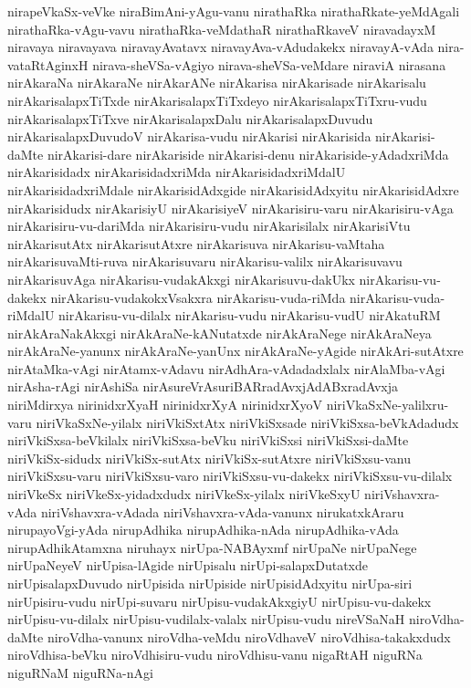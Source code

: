 {nirapeVkaSx-veVke
niraBimAni-yAgu-vanu
nirathaRka
nirathaRkate-yeMdAgali
nirathaRka-vAgu-vavu
nirathaRka-veMdathaR
nirathaRkaveV
niravadayxM
niravaya
niravayava
niravayAvatavx
niravayAva-vAdudakekx
niravayA-vAda
nira-vataRtAginxH
nirava-sheVSa-vAgiyo
nirava-sheVSa-veMdare
niraviA
nirasana
nirAkaraNa
nirAkaraNe
nirAkarANe
nirAkarisa
nirAkarisade
nirAkarisalu
nirAkarisalapxTiTxde
nirAkarisalapxTiTxdeyo
nirAkarisalapxTiTxru-vudu
nirAkarisalapxTiTxve
nirAkarisalapxDalu
nirAkarisalapxDuvudu
nirAkarisalapxDuvudoV
nirAkarisa-vudu
nirAkarisi
nirAkarisida
nirAkarisi-daMte
nirAkarisi-dare
nirAkariside
nirAkarisi-denu
nirAkariside-yAdadxriMda
nirAkarisidadx
nirAkarisidadxriMda
nirAkarisidadxriMdalU
nirAkarisidadxriMdale
nirAkarisidAdxgide
nirAkarisidAdxyitu
nirAkarisidAdxre
nirAkarisidudx
nirAkarisiyU
nirAkarisiyeV
nirAkarisiru-varu
nirAkarisiru-vAga
nirAkarisiru-vu-dariMda
nirAkarisiru-vudu
nirAkarisilalx
nirAkarisiVtu
nirAkarisutAtx
nirAkarisutAtxre
nirAkarisuva
nirAkarisu-vaMtaha
nirAkarisuvaMti-ruva
nirAkarisuvaru
nirAkarisu-valilx
nirAkarisuvavu
nirAkarisuvAga
nirAkarisu-vudakAkxgi
nirAkarisuvu-dakUkx
nirAkarisu-vu-dakekx
nirAkarisu-vudakokxVsakxra
nirAkarisu-vuda-riMda
nirAkarisu-vuda-riMdalU
nirAkarisu-vu-dilalx
nirAkarisu-vudu
nirAkarisu-vudU
nirAkatuRM
nirAkAraNakAkxgi
nirAkAraNe-kANutatxde
nirAkAraNege
nirAkAraNeya
nirAkAraNe-yanunx
nirAkAraNe-yanUnx
nirAkAraNe-yAgide
nirAkAri-sutAtxre
nirAtaMka-vAgi
nirAtamx-vAdavu
nirAdhAra-vAdadadxlalx
nirAlaMba-vAgi
nirAsha-rAgi
nirAshiSa
nirAsureVrAsuriBARradAvxjAdABxradAvxja
niriMdirxya
nirinidxrXyaH
nirinidxrXyA
nirinidxrXyoV
niriVkaSxNe-yalilxru-varu
niriVkaSxNe-yilalx
niriVkiSxtAtx
niriVkiSxsade
niriVkiSxsa-beVkAdadudx
niriVkiSxsa-beVkilalx
niriVkiSxsa-beVku
niriVkiSxsi
niriVkiSxsi-daMte
niriVkiSx-sidudx
niriVkiSx-sutAtx
niriVkiSx-sutAtxre
niriVkiSxsu-vanu
niriVkiSxsu-varu
niriVkiSxsu-varo
niriVkiSxsu-vu-dakekx
niriVkiSxsu-vu-dilalx
niriVkeSx
niriVkeSx-yidadxdudx
niriVkeSx-yilalx
niriVkeSxyU
niriVshavxra-vAda
niriVshavxra-vAdada
niriVshavxra-vAda-vanunx
nirukatxkAraru
nirupayoVgi-yAda
nirupAdhika
nirupAdhika-nAda
nirupAdhika-vAda
nirupAdhikAtamxna
niruhayx
nirUpa-NABAyxmf
nirUpaNe
nirUpaNege
nirUpaNeyeV
nirUpisa-lAgide
nirUpisalu
nirUpi-salapxDutatxde
nirUpisalapxDuvudo
nirUpisida
nirUpiside
nirUpisidAdxyitu
nirUpa-siri
nirUpisiru-vudu
nirUpi-suvaru
nirUpisu-vudakAkxgiyU
nirUpisu-vu-dakekx
nirUpisu-vu-dilalx
nirUpisu-vudilalx-valalx
nirUpisu-vudu
nireVSaNaH
niroVdha-daMte
niroVdha-vanunx
niroVdha-veMdu
niroVdhaveV
niroVdhisa-takakxdudx
niroVdhisa-beVku
niroVdhisiru-vudu
niroVdhisu-vanu
nigaRtAH
niguRNa
niguRNaM
niguRNa-nAgi
}

